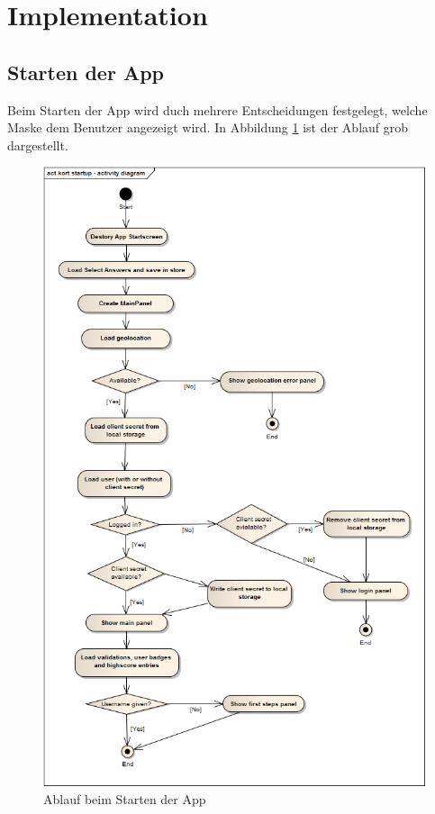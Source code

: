 \section{Implementation}

\subsection{Starten der App}
Beim Starten der App wird duch mehrere Entscheidungen festgelegt, welche Maske dem Benutzer angezeigt wird. In Abbildung \ref{image-kort-startup-activitydiagram} ist der Ablauf grob dargestellt.

\begin{figure}[H]
	\centering
	\includegraphics[scale=0.55]{images/uml/kort-startup-activitydiagram}
	\caption{Ablauf beim Starten der App}
	\label{image-kort-startup-activitydiagram}
\end{figure}

